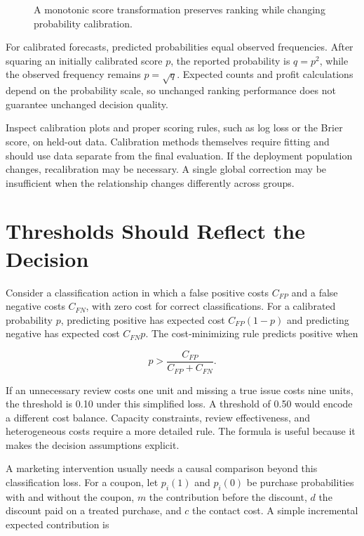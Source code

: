 \begin{figure}[htbp]
\centering

\caption{A monotonic score transformation preserves ranking while changing probability calibration.}\label{fig:M07_calibration}
\end{figure}

For calibrated forecasts, predicted probabilities equal observed
frequencies. After squaring an initially calibrated score \(p\), the
reported probability is \(q=p^2\), while the observed frequency remains
\(p=\sqrt{q}\). Expected counts and profit calculations depend on the
probability scale, so unchanged ranking performance does not guarantee
unchanged decision quality.

Inspect calibration plots and proper scoring rules, such as log loss or
the Brier score, on held-out data. Calibration methods themselves
require fitting and should use data separate from the final evaluation.
If the deployment population changes, recalibration may be necessary. A
single global correction may be insufficient when the relationship
changes differently across groups.

\hypertarget{M07-thresholds-should-reflect-the-decision}{%
\section{Thresholds Should Reflect the
Decision}\label{M07-thresholds-should-reflect-the-decision}}

\noindent Consider a classification action in which a false positive costs
\(C_{FP}\) and a false negative costs \(C_{FN}\), with zero cost for
correct classifications. For a calibrated probability \(p\), predicting
positive has expected cost \(C_{FP}(1-p)\) and predicting negative has
expected cost \(C_{FN}p\). The cost-minimizing rule predicts positive
when

\[
p>\frac{C_{FP}}{C_{FP}+C_{FN}}.
\]

If an unnecessary review costs one unit and missing a true issue costs
nine units, the threshold is 0.10 under this simplified loss. A
threshold of 0.50 would encode a different cost balance. Capacity
constraints, review effectiveness, and heterogeneous costs require a
more detailed rule. The formula is useful because it makes the decision
assumptions explicit.

A marketing intervention usually needs a causal comparison beyond this
classification loss. For a coupon, let \(p_i(1)\) and \(p_i(0)\) be
purchase probabilities with and without the coupon, \(m\) the
contribution before the discount, \(d\) the discount paid on a treated
purchase, and \(c\) the contact cost. A simple incremental expected
contribution is

